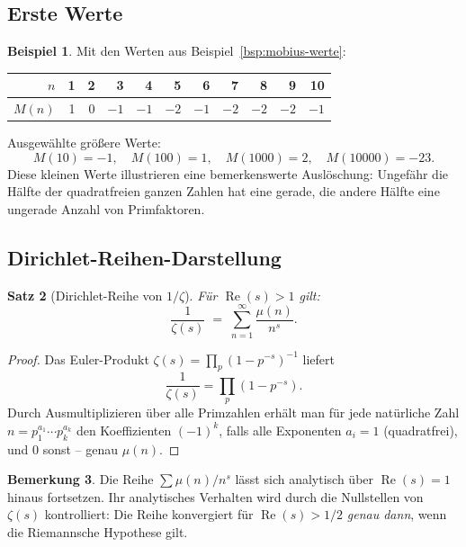 \documentclass[12pt,a4paper]{amsart}
\newtheorem{theorem}{Satz}[section]
\theoremstyle{definition}
\newtheorem{beispiel}[theorem]{Beispiel}
\newtheorem{bemerkung}[theorem]{Bemerkung}
\begin{document}
\subsection{Erste Werte}

\begin{beispiel}
\label{bsp:mertens-werte}
Mit den Werten aus Beispiel~\ref{bsp:mobius-werte}:
\begin{center}
\begin{tabular}{r|rrrrrrrrrr}
$n$    & 1 & 2 & 3 & 4 & 5 & 6 & 7 & 8 & 9 & 10 \\
\hline
$M(n)$ & 1 & 0 & $-1$ & $-1$ & $-2$ & $-1$ & $-2$ & $-2$ & $-2$ & $-1$
\end{tabular}
\end{center}

Ausgewählte größere Werte:
\[
  M(10) = -1, \quad M(100) = 1, \quad M(1000) = 2, \quad M(10000) = -23.
\]
Diese kleinen Werte illustrieren eine bemerkenswerte Auslöschung: Ungefähr
die Hälfte der quadratfreien ganzen Zahlen hat eine gerade, die andere Hälfte
eine ungerade Anzahl von Primfaktoren.
\end{beispiel}

\subsection{Dirichlet-Reihen-Darstellung}

\begin{theorem}[Dirichlet-Reihe von $1/\zeta$]
\label{satz:dirichlet-reihe}
Für $\operatorname{Re}(s) > 1$ gilt:
\[
  \frac{1}{\zeta(s)} \;=\; \sum_{n=1}^{\infty} \frac{\mu(n)}{n^s}.
\]
\end{theorem}

\begin{proof}
Das Euler-Produkt $\zeta(s) = \prod_p (1-p^{-s})^{-1}$ liefert
\[
  \frac{1}{\zeta(s)} = \prod_p (1 - p^{-s}).
\]
Durch Ausmultiplizieren über alle Primzahlen erhält man für jede natürliche
Zahl $n = p_1^{a_1} \cdots p_k^{a_k}$ den Koeffizienten $(-1)^k$, falls alle
Exponenten $a_i=1$ (quadratfrei), und $0$ sonst – genau $\mu(n)$.
\end{proof}

\begin{bemerkung}
Die Reihe $\sum \mu(n)/n^s$ lässt sich analytisch über $\operatorname{Re}(s)=1$
hinaus fortsetzen.  Ihr analytisches Verhalten wird durch die Nullstellen von
$\zeta(s)$ kontrolliert: Die Reihe konvergiert für $\operatorname{Re}(s)>1/2$
\emph{genau dann}, wenn die Riemannsche Hypothese gilt.
\end{bemerkung}
\end{document}
